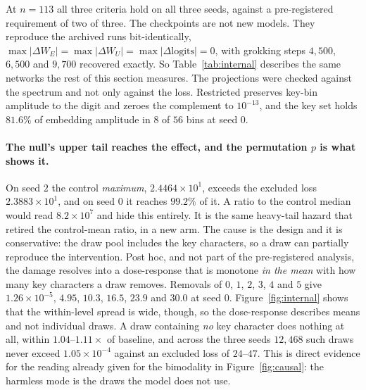 At $n = 113$ all three criteria hold on all three seeds, against a pre-registered requirement
of two of three. The checkpoints are not new models. They reproduce the archived runs bit-identically,
$\max\lvert \Delta W_{E} \rvert = \max\lvert \Delta W_{U} \rvert
= \max\lvert \Delta \mathrm{logits} \rvert = 0$, with grokking steps $4{,}500$, $6{,}500$ and
$9{,}700$ recovered exactly. So Table~\ref{tab:internal} describes the same networks the rest
of this section measures. The projections were checked against the spectrum and not only
against the loss. Restricted preserves key-bin amplitude to the digit and zeroes the
complement to $10^{-13}$, and the key set holds $81.6\%$ of embedding amplitude in $8$ of $56$
bins at seed $0$.

\paragraph{The null's upper tail reaches the effect, and the permutation $p$ is what shows
it.} On seed $2$ the control \emph{maximum}, $2.4464 \times 10^{1}$, exceeds the excluded loss
$2.3883 \times 10^{1}$, and on seed $0$ it reaches $99.2\%$ of it. A ratio to the control
median would read $8.2 \times 10^{7}$ and hide this entirely. It is the same heavy-tail hazard
that retired the control-mean ratio, in a new arm. The cause is the design and it is
conservative: the draw pool includes the key characters, so a draw can partially reproduce
the intervention. Post hoc, and not part of the pre-registered analysis, the damage resolves into a
dose-response that is monotone \emph{in the mean} with how many key characters a draw removes.
Removals of $0$, $1$, $2$, $3$, $4$ and $5$ give $1.26 \times 10^{-5}$, $4.95$, $10.3$, $16.5$,
$23.9$ and $30.0$ at seed $0$. Figure~\ref{fig:internal} shows that the within-level spread is
wide, though, so the dose-response describes means and not individual draws. A draw containing \emph{no} key character does nothing at all, within $1.04$--$1.11
\times$ of baseline, and across the three seeds $12{,}468$ such draws never exceed
$1.05 \times 10^{-4}$ against an excluded loss of $24$--$47$. This is direct evidence for the
reading already given for the bimodality in Figure~\ref{fig:causal}: the harmless mode is the
draws the model does not use.

